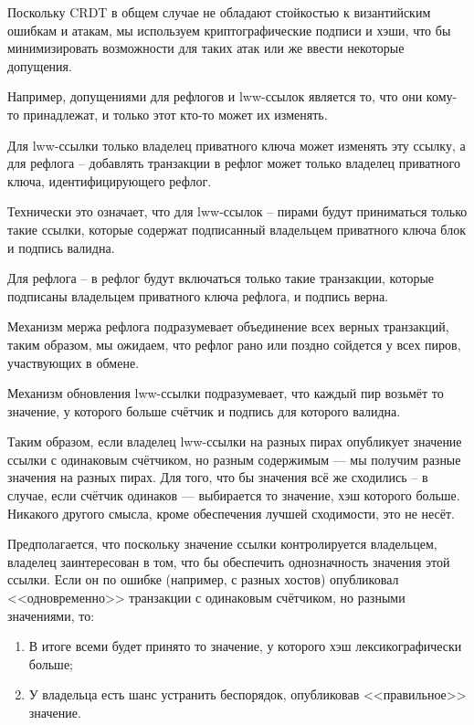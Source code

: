 \documentclass[11pt,a4paper]{article}
\begin{document}
Поскольку CRDT в общем случае не обладают стойкостью к византийским ошибкам и атакам, мы
используем криптографические подписи и хэши, что бы минимизировать возможности для таких
атак  или же ввести некоторые допущения.

Например, допущениями для рефлогов и lww-ссылок является то, что они кому-то принадлежат,
и только этот кто-то может их изменять.

Для lww-ссылки только владелец приватного ключа может изменять эту ссылку, а для рефлога --
добавлять транзакции в рефлог может только владелец приватного ключа, идентифицирующего
рефлог.

Технически это означает, что для lww-ссылок -- пирами будут приниматься только такие ссылки,
которые содержат подписанный владельцем приватного ключа блок и подпись валидна.

Для рефлога -- в рефлог будут включаться только такие транзакции, которые подписаны владельцем
приватного ключа рефлога, и подпись верна.

Механизм мержа рефлога подразумевает объединение всех верных транзакций, таким образом, мы ожидаем,
что рефлог рано или поздно сойдется у всех пиров, участвующих в обмене.

Механизм обновления lww-ссылки подразумевает, что каждый пир возьмёт то значение, у которого
больше счётчик и подпись для которого валидна.

Таким образом, если владелец lww-ссылки на разных пирах опубликует значение ссылки с одинаковым
счётчиком, но разным содержимым --- мы получим разные значения на разных пирах. Для того, что бы
значения всё же сходились -- в случае, если счётчик одинаков --- выбирается то значение, хэш
которого больше. Никакого другого смысла, кроме обеспечения лучшей сходимости, это не несёт.

Предполагается, что поскольку значение ссылки контролируется владельцем, владелец заинтересован
в том, что бы обеспечить однозначность значения этой ссылки. Если он по ошибке (например, с разных
хостов) опубликовал <<одновременно>> транзакции с одинаковым счётчиком, но разными значениями, то:

\begin{enumerate}
  \item В итоге всеми будет принято то значение, у которого хэш лексикографически больше;
  \item У владельца есть шанс устранить беспорядок, опубликовав <<правильное>> значение.
\end{enumerate}
\end{document}
